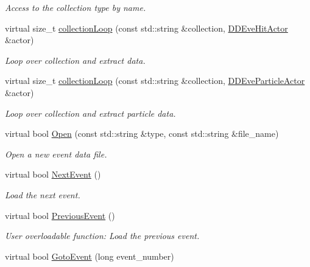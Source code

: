 \begin{DoxyCompactItemize}
\begin{DoxyCompactList}\small\item\em Access to the collection type by name. \end{DoxyCompactList}\item 
virtual size\+\_\+t \hyperlink{class_d_d4hep_1_1_generic_event_handler_a1186d6415d8d7e01f51993e204d5931f}{collection\+Loop} (const std\+::string \&collection, \hyperlink{struct_d_d4hep_1_1_d_d_eve_hit_actor}{D\+D\+Eve\+Hit\+Actor} \&actor)
\begin{DoxyCompactList}\small\item\em Loop over collection and extract data. \end{DoxyCompactList}\item 
virtual size\+\_\+t \hyperlink{class_d_d4hep_1_1_generic_event_handler_aa733b6de00ba09d05b2c4e33b0cd3232}{collection\+Loop} (const std\+::string \&collection, \hyperlink{struct_d_d4hep_1_1_d_d_eve_particle_actor}{D\+D\+Eve\+Particle\+Actor} \&actor)
\begin{DoxyCompactList}\small\item\em Loop over collection and extract particle data. \end{DoxyCompactList}\item 
virtual bool \hyperlink{class_d_d4hep_1_1_generic_event_handler_ab1a4e53010cf2aafdef02f8ceafc6ef0}{Open} (const std\+::string \&type, const std\+::string \&file\+\_\+name)
\begin{DoxyCompactList}\small\item\em Open a new event data file. \end{DoxyCompactList}\item 
virtual bool \hyperlink{class_d_d4hep_1_1_generic_event_handler_a0dc8d4d5dde63d3278f67da79e86b590}{Next\+Event} ()
\begin{DoxyCompactList}\small\item\em Load the next event. \end{DoxyCompactList}\item 
virtual bool \hyperlink{class_d_d4hep_1_1_generic_event_handler_a4b833d9537c7c29b0bfb0d567f98d0a3}{Previous\+Event} ()
\begin{DoxyCompactList}\small\item\em User overloadable function\+: Load the previous event. \end{DoxyCompactList}\item 
virtual bool \hyperlink{class_d_d4hep_1_1_generic_event_handler_a7a7c4d1592e5b2d467a426058aa1a44b}{Goto\+Event} (long event\+\_\+number)

\end{DoxyCompactItemize}

